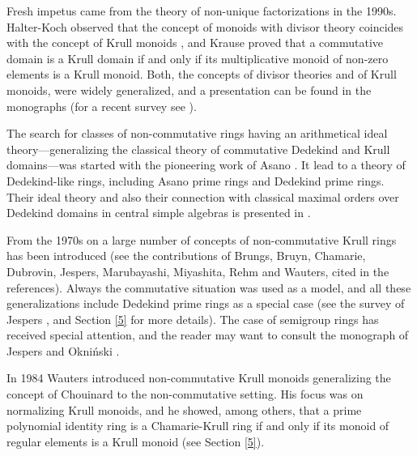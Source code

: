 \documentclass[a4paper]{amsart}
\theoremstyle{definition}
\numberwithin{equation}{section}
\begin{document}
Fresh impetus   came from the theory of non-unique factorizations in
the 1990s.  Halter-Koch observed that  the concept of monoids
with divisor theory coincides with the concept of Krull monoids
\cite{HK90b}, and Krause \cite{Kr89} proved that a commutative
domain is a Krull domain if and only if its multiplicative monoid of
non-zero elements is a Krull monoid. Both, the concepts of divisor
theories and of Krull monoids, were widely generalized, and a
presentation can be found in the monographs \cite{HK98, Ge-HK06a}
(for a recent survey see \cite{HK10b}).

The search for classes of non-commutative rings having an
arithmetical ideal theory---generalizing the classical theory of
commutative Dedekind and Krull domains---was started with the
pioneering work of  Asano \cite{As39a, As49a, As50a, As-Mu53a}.
It lead to a theory of Dedekind-like rings, including  Asano prime
rings and Dedekind prime rings. Their ideal theory and also their
connection with classical maximal orders over Dedekind domains in
central simple algebras is presented in \cite{Mc-Ro01a}.

From the 1970s on a large number of concepts of non-commutative Krull rings has been
introduced (see the contributions of Brungs, Bruyn, Chamarie,
Dubrovin, Jespers, Marubayashi, Miyashita, Rehm and Wauters, cited
in the references). Always the commutative situation was used as a
model, and all these generalizations include Dedekind prime rings as
a special case (see the survey of  Jespers \cite{Je86a}, and Section
\ref{5} for more details). The case of semigroup rings has received
special attention, and the reader may want to consult the monograph
of Jespers and Okni{\'n}ski \cite{Je-Ok07a}.

In 1984  Wauters \cite{Wa84a} introduced non-commutative Krull
monoids generalizing the concept of Chouinard to the non-commutative
setting. His focus was on normalizing Krull monoids, and he showed,
among others, that a prime polynomial identity ring is a
Chamarie-Krull ring if and only if its monoid of regular elements is
a Krull monoid (see  Section \ref{5}).
\end{document}
